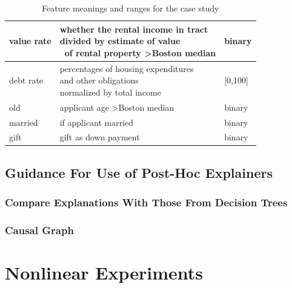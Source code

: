 \documentclass[mnsc,blindrev]{informs3}
\begin{document}
\begin{table}[]
\begin{tabular}{|l|l|l|}
            value rate               & \makecell{whether the rental income in tract \\ divided by estimate of value \\\ of rental property \textgreater Boston median} & binary                        \\ \hline
            debt rate           & \makecell{percentages of housing expenditures \\ and other obligations \\ normalized by total income}    & {[}0,100{]}                   \\ \hline
            old              & applicant age \textgreater Boston median & binary                        \\ \hline
            married          & if applicant married               & binary                        \\ \hline
            gift             & gift as down payment               & binary                         \\
            \end{tabular}
            \caption{Feature meanings and ranges for the case study}
            \label{tab:case_study_features}
        \end{table}

\subsection{Guidance For Use of Post-Hoc Explainers}
    \subsubsection{Compare Explanations With Those From Decision Trees}

    \subsubsection{Causal Graph}


\section{Nonlinear Experiments}
\end{document}
